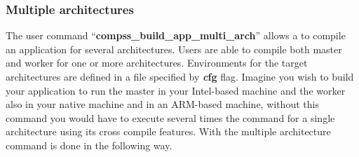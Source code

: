 \subsubsection{Multiple architectures}

The user command ``{\bf compss\_build\_app\_multi\_arch}'' allows a to compile an application for several architectures. Users are able to compile both master and worker for one or more architectures. Environments for the target architectures are defined in a file specified by {\textbf{\textit cfg}} flag. Imagine you wish to build your application to run the master in your Intel-based machine and the worker also in your native machine and in an ARM-based machine, without this command you would have to execute several times the command for a single architecture using its cross compile features. With the multiple architecture command is done in the following way.


